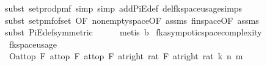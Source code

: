 \begin{isabellebody}
\ {\isacharparenleft}{\kern0pt}subst\ set{\isacharunderscore}{\kern0pt}prod{\isacharunderscore}{\kern0pt}pmf{\isacharcomma}{\kern0pt}\ simp{\isacharcomma}{\kern0pt}\ simp\ add{\isacharcolon}{\kern0pt}PiE{\isacharunderscore}{\kern0pt}def\ del{\isacharcolon}{\kern0pt}fk{\isacharunderscore}{\kern0pt}space{\isacharunderscore}{\kern0pt}usage{\isachardot}{\kern0pt}simps{\isacharparenright}{\kern0pt}\isanewline
\ \ \ \ \isamarkupfalse%
\ {\isacharparenleft}{\kern0pt}subst\ set{\isacharunderscore}{\kern0pt}pmf{\isacharunderscore}{\kern0pt}of{\isacharunderscore}{\kern0pt}set\ {\isacharbrackleft}{\kern0pt}OF\ non{\isacharunderscore}{\kern0pt}empty{\isacharunderscore}{\kern0pt}space{\isacharbrackleft}{\kern0pt}OF\ assms{\isacharparenleft}{\kern0pt}{}{\isacharparenright}{\kern0pt}{\isacharbrackright}{\kern0pt}\ fin{\isacharunderscore}{\kern0pt}space{\isacharbrackleft}{\kern0pt}OF\ assms{\isacharparenleft}{\kern0pt}{}{\isacharparenright}{\kern0pt}{\isacharbrackright}{\kern0pt}{\isacharbrackright}{\kern0pt}{\isacharparenright}{\kern0pt}\isanewline
\ \ \ \ \isamarkupfalse%
\ {\isacharparenleft}{\kern0pt}subst\ PiE{\isacharunderscore}{\kern0pt}def{\isacharbrackleft}{\kern0pt}symmetric{\isacharbrackright}{\kern0pt}{\isacharparenright}{\kern0pt}\isanewline
\ \ \ \ \isamarkupfalse%
\ {\isacharparenleft}{\kern0pt}metis\ b{\isacharparenright}{\kern0pt}\isanewline
{}\isamarkupfalse%
%
\endisatagproof
{\isafoldproof}%
%
\isadelimproof
\isanewline
%
\endisadelimproof
\isanewline
{}\isamarkupfalse%
\ fk{\isacharunderscore}{\kern0pt}asympotic{\isacharunderscore}{\kern0pt}space{\isacharunderscore}{\kern0pt}complexity{\isacharcolon}{\kern0pt}\isanewline
\ \ {\isachardoublequoteopen}fk{\isacharunderscore}{\kern0pt}space{\isacharunderscore}{\kern0pt}usage\ {\isasymin}\ \isanewline
\ \ O{\isacharbrackleft}{\kern0pt}at{\isacharunderscore}{\kern0pt}top\ {\isasymtimes}\isactrlsub F\ at{\isacharunderscore}{\kern0pt}top\ {\isasymtimes}\isactrlsub F\ at{\isacharunderscore}{\kern0pt}top\ {\isasymtimes}\isactrlsub F\ at{\isacharunderscore}{\kern0pt}right\ {\isacharparenleft}{\kern0pt}{}{\isacharcolon}{\kern0pt}{\isacharcolon}{\kern0pt}rat{\isacharparenright}{\kern0pt}\ {\isasymtimes}\isactrlsub F\ at{\isacharunderscore}{\kern0pt}right\ {\isacharparenleft}{\kern0pt}{}{\isacharcolon}{\kern0pt}{\isacharcolon}{\kern0pt}rat{\isacharparenright}{\kern0pt}{\isacharbrackright}{\kern0pt}{\isacharparenleft}{\kern0pt}{\isasymlambda}\ {\isacharparenleft}{\kern0pt}k{\isacharcomma}{\kern0pt}\ n{\isacharcomma}{\kern0pt}\ m{\isacharcomma}{\kern0pt}\ {\isasymepsilon}{\isacharcomma}{\kern0pt}\ {\isasymdelta}{\isacharparenright}{\kern0pt}{\isachardot}{\kern0pt}\isanewline

\end{isabellebody}
